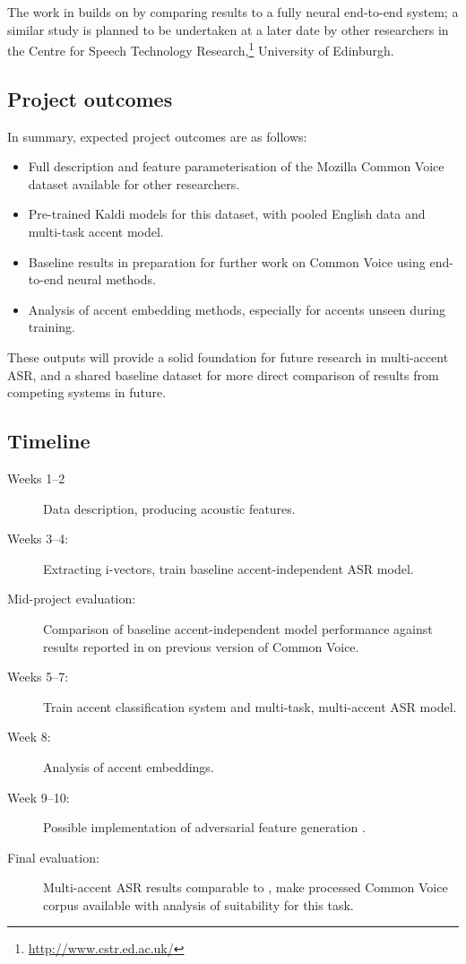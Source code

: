 \documentclass[a4paper]{article}
\begin{document}
The work in \cite{viglino2019EndtoEndAccentedSpeech} builds on \cite{jain2018ImprovedAccentedSpeech} by comparing results to a fully neural end-to-end system; a similar study is planned to be undertaken at a later date by other researchers in the Centre for Speech Technology Research,\footnote{\url{http://www.cstr.ed.ac.uk/}} University of Edinburgh.


\subsection{Project outcomes}
In summary, expected project outcomes are as follows:

\begin{itemize}
  \item Full description and feature parameterisation of the Mozilla Common Voice dataset available for other researchers.
  \item Pre-trained Kaldi models for this dataset, with pooled English data and multi-task accent model.
  \item Baseline results in preparation for further work on Common Voice using end-to-end neural methods.
  \item Analysis of accent embedding methods, especially for accents unseen during training.
\end{itemize}

These outputs will provide a solid foundation for future research in multi-accent ASR, and a shared baseline dataset for more direct comparison of results from competing systems in future.


\subsection{Timeline}

\begin{description}
  \item [Weeks 1--2] Data description, producing acoustic features.
  \item [Weeks 3--4:] Extracting i-vectors, train baseline accent-independent ASR model.
  \item [Mid-project evaluation:] Comparison of baseline accent-independent model performance against results reported in \cite{jain2018ImprovedAccentedSpeech} on previous version of Common Voice.
  \item [Weeks 5--7:] Train accent classification system and multi-task, multi-accent ASR model.
  \item [Week 8:] Analysis of accent embeddings.
  \item [Week 9--10:] Possible implementation of adversarial feature generation \cite{chen2019AIPNetGenerativeAdversarial}.
  \item [Final evaluation:] Multi-accent ASR results comparable to \cite{jain2018ImprovedAccentedSpeech}, make processed Common Voice corpus available with analysis of suitability for this task.
\end{description}


\printbibliography
\end{document}
